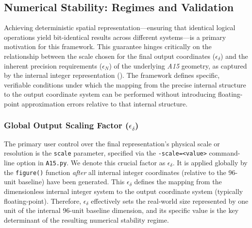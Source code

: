 \documentclass[10pt]{article}
\def\AAAB{\textit{A15}}
\begin{document}
\subsection{Numerical Stability: Regimes and Validation}\label{subsec-stability}

Achieving deterministic spatial representation—ensuring that identical logical operations yield bit-identical results across different systems—is a primary motivation for this framework. This guarantee hinges critically on the relationship between the scale chosen for the final output coordinates ($\epsilon_\delta$) and the inherent precision requirements ($\epsilon_N$) of the underlying \AAAB{} geometry, as captured by the internal integer representation (). The framework defines specific, verifiable conditions under which the mapping from the precise internal structure to the output coordinate system can be performed without introducing floating-point approximation errors relative to that internal structure.

\subsubsection{Global Output Scaling Factor ($\epsilon_\delta$)}\label{subsubsec-stability-epsilon-d}
The primary user control over the final representation's physical scale or resolution is the \texttt{scale} parameter, specified via the \texttt{-scale=<value>} command-line option in \texttt{A15.py}. We denote this crucial factor as $\epsilon_\delta$. It is applied globally by the \texttt{figure()} function \emph{after} all internal integer coordinates (relative to the 96-unit baseline) have been generated. This $\epsilon_\delta$ defines the mapping from the dimensionless internal integer system to the output coordinate system (typically floating-point). Therefore, $\epsilon_\delta$ effectively sets the real-world size represented by one unit of the internal 96-unit baseline dimension, and its specific value is the key determinant of the resulting numerical stability regime.
\end{document}
